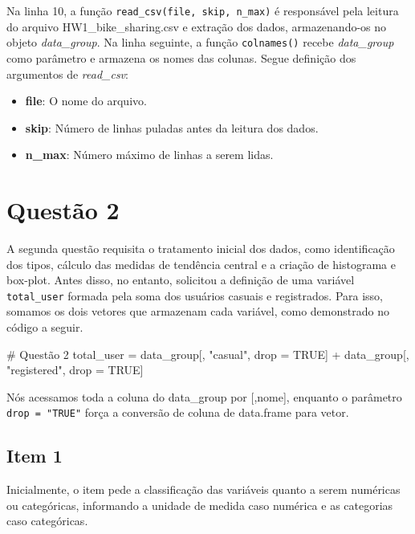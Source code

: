 \documentclass[a4paper, 12pt, titlepage]{article}
\begin{document}
Na linha 10, a função \texttt{read\_csv(file, skip, n\_max)} é responsável pela leitura do arquivo HW1\_bike\_sharing.csv e extração dos dados, armazenando-os no objeto \textit{data\_group}. Na linha seguinte, a função \texttt{colnames()} recebe \textit{data\_group} como parâmetro e armazena os nomes das colunas. Segue definição dos argumentos de \textit{read\_csv}:

\begin{itemize}
    \item \textbf{file}: O nome do arquivo.
    \item \textbf{skip}: Número de linhas puladas antes da leitura dos dados.
    \item \textbf{n\_max}: Número máximo de linhas a serem lidas.
\end{itemize}

\newpage
\section*{Questão 2}
A segunda questão requisita o tratamento inicial dos dados, como identificação dos tipos, cálculo das medidas de tendência central e a criação de histograma e box-plot. Antes disso, no entanto, solicitou a definição de uma variável \texttt{total\_user} formada pela soma dos usuários casuais e registrados. Para isso, somamos os dois vetores que armazenam cada variável, como demonstrado no código a seguir.

\begin{rcode}[firstnumber=13, caption={Definição de total\_user},breaklines=true, breakatwhitespace=true]
    # Questão 2
    total_user = data_group[, "casual", drop = TRUE] + data_group[, "registered", drop = TRUE]
\end{rcode}

Nós acessamos toda a coluna do data\_group por [,nome], enquanto o parâmetro \texttt{drop = "TRUE"} força a conversão de coluna de data.frame para vetor.

\subsection*{Item 1}
Inicialmente, o item pede a classificação das variáveis quanto a serem numéricas ou categóricas, informando a unidade de medida caso numérica e as categorias caso categóricas.
\end{document}
